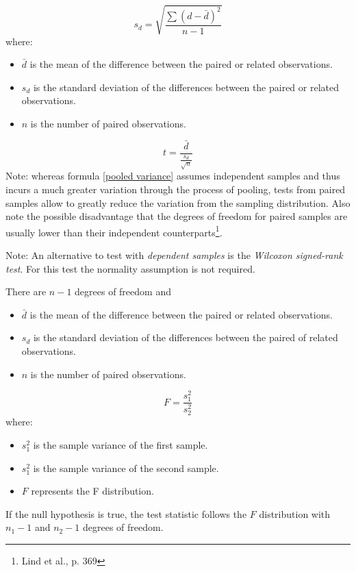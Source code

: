 \begin{equation}
\label{standard deviation of differences}
s_{d} = \sqrt{\frac{\sum(d - \bar{d})^2}{n - 1}}
\end{equation}
where:
\begin{itemize}
 \item $\bar{d}$ is the mean of the difference between the paired or related observations.
 \item $s_{d}$ is the standard deviation of the differences between the paired or related observations.
 \item $n$ is the number of paired observations.
\end{itemize}
\hformbar


\begin{equation}
\label{paired t test}
t = \frac{\bar{d}}{\frac{s_{d}}{\sqrt{n}}}
\end{equation}
Note: whereas formula \eqref{pooled variance} assumes independent samples and thus incurs a much greater variation through the process of pooling, tests from paired samples allow to greatly reduce the variation from the sampling distribution. Also note the possible disadvantage that the degrees of freedom for paired samples are usually lower than their independent counterparts\footnote{Lind et al., p. 369}.

Note: An alternative to test with \emph{dependent samples} is the \textit{Wilcoxon signed-rank test}. For this test the normality assumption is not required.

There are $n-1$ degrees of freedom and
\begin{itemize}
 \item $\bar{d}$ is the mean of the difference between  the paired or related observations.
 \item $s_{d}$ is the standard deviation of the differences between the paired of related observations.
 \item $n$ is the number of paired observations.
\end{itemize}
\hformbar


\begin{equation}
\label{test statistic for comparing two variances}
F = \frac{s^{2}_{1}}{s^{2}_{2}}
\end{equation}
where:
\begin{itemize}
 \item $s^{2}_{1}$ is the sample variance of the first sample.
 \item $s^{2}_{1}$ is the sample variance of the second sample.
 \item $F$ represents the F distribution.
\end{itemize}
If the null hypothesis is true, the test statistic follows the $F$ distribution with $n_{1}-1$ and $n_{2}-1$ degrees of freedom.
\hformbar


